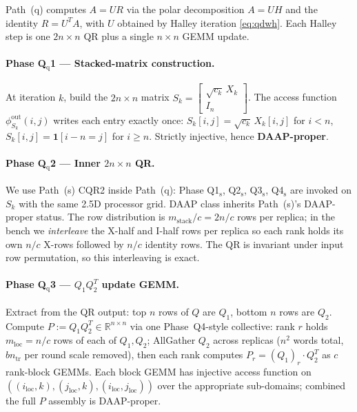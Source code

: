 \documentclass[11pt]{article}
\begin{document}
Path~(q) computes $A = U R$ via the polar decomposition $A = U H$ and
the identity $R = U^T A$, with $U$ obtained by Halley iteration
\eqref{eq:qdwh}.  Each Halley step is one $2n \times n$ QR plus a
single $n \times n$ GEMM update.

\paragraph{Phase Q$_{\mathrm{q}}$1 --- Stacked-matrix construction.}
At iteration $k$, build the $2n \times n$ matrix
$S_k = \begin{bmatrix}\sqrt{c_k}\, X_k \\ I_n\end{bmatrix}$.
The access function $\phi^{\mathrm{out}}_{S_k}(i, j)$ writes each
entry exactly once: $S_k[i, j] = \sqrt{c_k}\, X_k[i, j]$ for $i < n$,
$S_k[i, j] = \mathbf{1}[i - n = j]$ for $i \ge n$.  Strictly
injective, hence \textbf{DAAP-proper}.

\paragraph{Phase Q$_{\mathrm{q}}$2 --- Inner $2n \times n$ QR.}
We use Path~(s) CQR2 inside Path~(q): Phase Q1$_{\mathrm{s}}$,
Q2$_{\mathrm{s}}$, Q3$_{\mathrm{s}}$, Q4$_{\mathrm{s}}$ are invoked on
$S_k$ with the same 2.5D processor grid.  DAAP class inherits
Path~(s)'s DAAP-proper status.  The row distribution is
$m_{\text{stack}}/c = 2n/c$ rows per replica; in the bench we
\emph{interleave} the X-half and I-half rows per replica so each rank
holds its own $n/c$ X-rows followed by $n/c$ identity rows.  The QR is
invariant under input row permutation, so this interleaving is exact.

\paragraph{Phase Q$_{\mathrm{q}}$3 --- $Q_1 Q_2^T$ update GEMM.}
Extract from the QR output: top $n$ rows of $Q$ are $Q_1$, bottom $n$
rows are $Q_2$.  Compute
$P := Q_1 Q_2^T \in \mathbb{R}^{n \times n}$ via one Phase~Q4-style
collective: rank $r$ holds $m_{\text{loc}} = n/c$ rows of each of
$Q_1, Q_2$; AllGather $Q_2$ across replicas
($n^2$ words total, $b n_{\mathrm{tr}}$ per round scale removed),
then each rank computes
$P_r = (Q_1)_r \cdot Q_2^T$ as $c$ rank-block GEMMs.  Each block
GEMM has injective access function on
$((i_{\text{loc}}, k), (j_{\text{loc}}, k), (i_{\text{loc}},
j_{\text{loc}}))$ over the appropriate sub-domains; combined the full
$P$ assembly is DAAP-proper.
\end{document}
